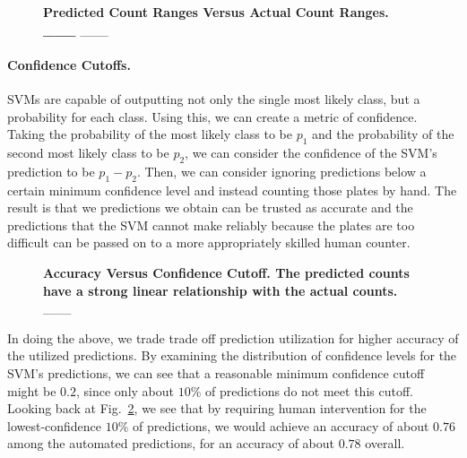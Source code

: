 \documentclass[10pt,letterpaper]{article}
\begin{document}
            \begin{figure}[h]
                
                \caption{{\bf Predicted Count Ranges Versus Actual Count Ranges. \_\_\_} \_\_\_}
                \label{svm_counts}
            \end{figure}
        
        \paragraph*{Confidence Cutoffs.}            
            SVMs are capable of outputting not only the single most likely class, but a probability for each class. Using this, we can create a metric of confidence. Taking the probability of the most likely class to be $p_1$ and the probability of the second most likely class to be $p_2$, we can consider the confidence of the SVM's prediction to be $p_1 - p_2$. Then, we can consider ignoring predictions below a certain minimum confidence level and instead counting those plates by hand. The result is that we predictions we obtain can be trusted as accurate and the predictions that the SVM cannot make reliably because the plates are too difficult can be passed on to a more appropriately skilled human counter.
            
            \begin{figure}[h]
                
                \caption{{\bf Accuracy Versus Confidence Cutoff. The predicted counts have a strong linear relationship with the actual counts.} \_\_\_}
                \label{svm_confidence_accuracy}
            \end{figure}
            
            In doing the above, we trade trade off prediction utilization for higher accuracy of the utilized predictions. By examining the distribution of confidence levels for the SVM's predictions, we can see that a reasonable minimum confidence cutoff might be $0.2$, since only about $10\%$ of predictions do not meet this cutoff. Looking back at Fig.~\ref{svm_confidence_accuracy}, we see that by requiring human intervention for the lowest-confidence $10\%$ of predictions, we would achieve an accuracy of about $0.76$ among the automated predictions, for an accuracy of about $0.78$ overall.
            
\end{document}
